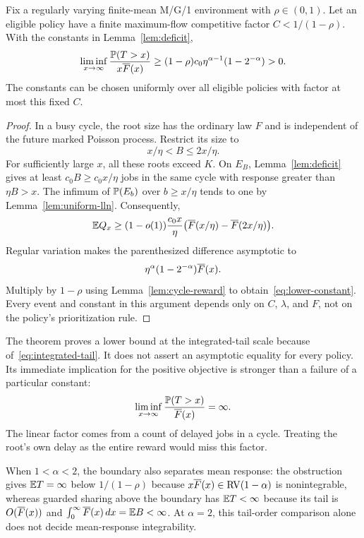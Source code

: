 \begin{theorem}\label{thm:obstruction}
Fix a regularly varying finite-mean M/G/1 environment with $\rho\in(0,1)$. Let an eligible policy have a finite maximum-flow competitive factor $C<1/(1-\rho)$. With the constants in Lemma~\ref{lem:deficit},
\begin{equation}\label{eq:lower-constant}
 \liminf_{x\to\infty}
  \frac{\mathbb P(T>x)}{x\overline F(x)}
 \geq (1-\rho)c_0\eta^{\alpha-1}(1-2^{-\alpha})>0.
\end{equation}
The constants can be chosen uniformly over all eligible policies with factor at most this fixed $C$.
\end{theorem}
\begin{proof}
In a busy cycle, the root size has the ordinary law $F$ and is independent of the future marked Poisson process. Restrict its size to
\begin{equation}\label{eq:root-range}
 x/\eta<B\leq2x/\eta.
\end{equation}
For sufficiently large $x$, all these roots exceed $K$. On $E_B$, Lemma~\ref{lem:deficit} gives at least $c_0B\geq c_0x/\eta$ jobs in the same cycle with response greater than $\eta B>x$. The infimum of $\mathbb P(E_b)$ over $b\geq x/\eta$ tends to one by Lemma~\ref{lem:uniform-lln}. Consequently,
\begin{equation}\label{eq:cycle-lower}
 \mathbb E Q_x\geq(1-o(1))\frac{c_0x}{\eta}
       \bigl(\overline F(x/\eta)-\overline F(2x/\eta)\bigr).
\end{equation}
Regular variation makes the parenthesized difference asymptotic to
\[
 \eta^\alpha(1-2^{-\alpha})\overline F(x).
\]
Multiply by $1-\rho$ using Lemma~\ref{lem:cycle-reward} to obtain~\eqref{eq:lower-constant}. Every event and constant in this argument depends only on $C$, $\lambda$, and $F$, not on the policy's prioritization rule.
\end{proof}

The theorem proves a lower bound at the integrated-tail scale because of~\eqref{eq:integrated-tail}. It does not assert an asymptotic equality for every policy. Its immediate implication for the positive objective is stronger than a failure of a particular constant:
\[
 \liminf_{x\to\infty}\frac{\mathbb P(T>x)}{\overline F(x)}=\infty.
\]
The linear factor comes from a count of delayed jobs in a cycle. Treating the root's own delay as the entire reward would miss this factor.


When $1<\alpha<2$, the boundary also separates mean response: the
obstruction gives $\mathbb E T=\infty$ below $1/(1-\rho)$ because
$x\overline F(x)\in\operatorname{RV}(1-\alpha)$ is nonintegrable, whereas guarded sharing
above the boundary has $\mathbb E T<\infty$ because its tail is
$O(\overline F(x))$ and $\int_0^\infty\overline F(x)\,dx=\mathbb E B<\infty$.
At $\alpha=2$, this tail-order comparison alone does not decide mean-response integrability.

